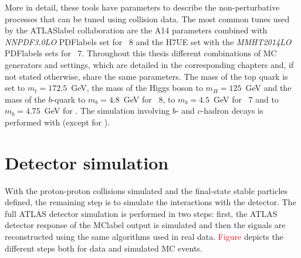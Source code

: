 More in detail, these tools have parameters to describe the non-perturbative processes that can be tuned using collision data. The most common tunes used by the \acrshort{ATLASlabel} collaboration are the A14 %
parameters combined with \textit{NNPDF3.0LO} \acrshort{PDFlabel}s set %
for \PYTHIA~8 and the H7UE set %
with the \textit{MMHT2014LO} \acrshort{PDFlabel}s sets %
for \HERWIG~7. Throughout this thesis different combinations of \acrshort{MC} generators and settings, which are detailed in the corresponding chapters and, if not stated otherwise, share the same parameters. The mass of the top quark is set to $m_t=172.5$~GeV, the mass of the Higgs boson to $m_H=125$~GeV and the mass of the $b$-quark to $m_b=4.8$~GeV for \PYTHIA~8, to $m_b=4.5$~GeV for \HERWIG~7 and to $m_b=4.75$~GeV for \SHERPA. The simulation involving $b$- and $c$-hadron decays is performed with \EVTGEN %
(except for \SHERPA). 

\section{Detector simulation}

With the proton-proton collisions simulated and the final-state stable particles defined, the remaining step is to simulate the interactions with the detector. The full \acrshort{ATLAS} detector simulation is performed in two steps: first, the \acrshort{ATLAS} detector response of the \acrshort{MClabel} output is simulated and then the signals are reconstructed using the same algorithms used in real data. \textcolor{red}{Figure} depicts the different steps both for data and simulated \acrshort{MC} events.

